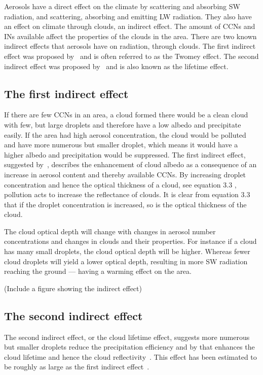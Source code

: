 Aerosols have a direct effect on the climate by scattering and absorbing SW radiation, and scattering, absorbing and emitting LW radiation.%
They also have an effect on climate through clouds, an indirect effect. The amount of CCNs and INs available affect the properties of the clouds in the area. There are two known indirect effects that aerosols have on radiation, through clouds. The first indirect effect was proposed by~\citet{Twomey1974} and is often referred to as the Twomey effect. The second indirect effect was proposed by~\citet{Albrecht1989} and is also known as the lifetime effect.


\subsection{The first indirect effect}%
If there are few CCNs in an area, a cloud formed there would be a clean cloud with few, but large droplets and therefore have a low albedo and precipitate easily. If the area had high aerosol concentration, the cloud would be polluted and have more numerous but smaller droplet, which means it would have a higher albedo and precipitation would be suppressed. 
The first indirect effect, suggested by~\citet{Twomey1974}, describes the enhancement of cloud albedo as a consequence of an increase in aerosol content and thereby available CCNs.
By increasing droplet concentration and hence the optical thickness of a cloud, see equation 3.3%
, pollution acts to increase the reflectance of clouds. It is clear from equation 3.3 that if the droplet concentration is increased, so is the optical thickness of the cloud.

The cloud optical depth will change with changes in aerosol number concentrations and changes in clouds and their properties. For instance if a cloud has many small droplets, the cloud optical depth will be higher. Whereas fewer cloud droplets will yield a lower optical depth, resulting in more SW radiation reaching the ground —  having a warming effect on the area. 

(Include a figure showing the indirect effect)

\subsection{The second indirect effect}

The second indirect effect, or the cloud lifetime effect, suggests more numerous but smaller droplets reduce the precipitation efficiency and by that enhances the cloud lifetime and hence the cloud reflectivity~\citep{Albrecht1989}. This effect has been estimated to be roughly as large as the first indirect effect~\citep{Lohmann2005}.

